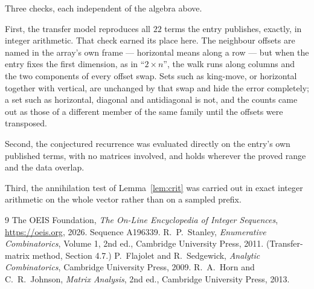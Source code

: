 \documentclass[11pt,a4paper]{article}
\theoremstyle{plain}
\theoremstyle{definition}
\begin{document}
Three checks, each independent of the algebra above.

First, the transfer model reproduces all $22$ terms the entry publishes, exactly, in
integer arithmetic. That check earned its place here. The neighbour offsets are named in the
array's own frame --- horizontal means along a row --- but when the entry fixes the first
dimension, as in ``$2\times n$'', the walk runs along columns and the two components of every
offset swap. Sets such as king-move, or horizontal together with vertical, are unchanged by
that swap and hide the error completely; a set such as horizontal, diagonal and antidiagonal
is not, and the counts came out as those of a different member of the same family until the
offsets were transposed.

Second, the conjectured recurrence was evaluated directly on the entry's own published terms,
with no matrices involved, and holds wherever the proved range and the data overlap.

Third, the annihilation test of Lemma~\ref{lem:crit} was carried out in exact integer
arithmetic on the whole vector rather than on a sampled prefix.

\begin{thebibliography}{9}
 The OEIS Foundation, \emph{The On-Line Encyclopedia of Integer
Sequences}, \url{https://oeis.org}, 2026. Sequence A196339.
 R.~P.~Stanley, \emph{Enumerative Combinatorics}, Volume 1, 2nd ed.,
Cambridge University Press, 2011. (Transfer-matrix method, Section 4.7.)
 P.~Flajolet and R.~Sedgewick, \emph{Analytic Combinatorics}, Cambridge
University Press, 2009.
 R.~A.~Horn and C.~R.~Johnson, \emph{Matrix Analysis}, 2nd ed., Cambridge
University Press, 2013.
\end{thebibliography}
\end{document}
